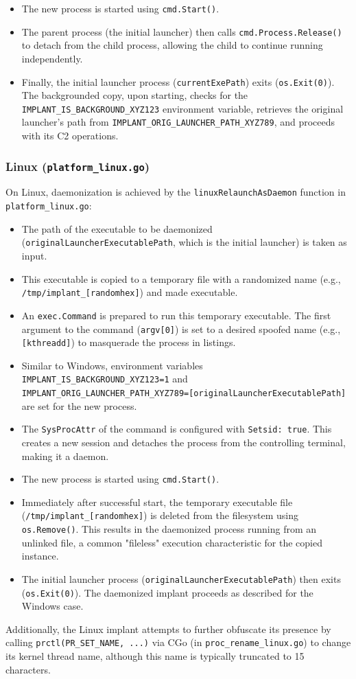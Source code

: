 \begin{itemize}
    \item The new process is started using \texttt{cmd.Start()}.
    \item The parent process (the initial launcher) then calls \texttt{cmd.Process.Release()} to detach from the child process, allowing the child to continue running independently.
    \item Finally, the initial launcher process (\texttt{currentExePath}) exits (\texttt{os.Exit(0)}). The backgrounded copy, upon starting, checks for the \texttt{IMPLANT\_IS\_BACKGROUND\_XYZ123} environment variable, retrieves the original launcher's path from \texttt{IMPLANT\_ORIG\_LAUNCHER\_PATH\_XYZ789}, and proceeds with its C2 operations.
\end{itemize}

\subsubsection{Linux (\texttt{platform\_linux.go})}
On Linux, daemonization is achieved by the \texttt{linuxRelaunchAsDaemon} function in \texttt{platform\_linux.go}:
\begin{itemize}
    \item The path of the executable to be daemonized (\texttt{originalLauncherExecutablePath}, which is the initial launcher) is taken as input.
    \item This executable is copied to a temporary file with a randomized name (e.g., \texttt{/tmp/implant\_[randomhex]}) and made executable.
    \item An \texttt{exec.Command} is prepared to run this temporary executable. The first argument to the command (\texttt{argv[0]}) is set to a desired spoofed name (e.g., \texttt{[kthreadd]}) to masquerade the process in listings.
    \item Similar to Windows, environment variables \texttt{IMPLANT\_IS\_BACKGROUND\_XYZ123=1} and \texttt{IMPLANT\_ORIG\_LAUNCHER\_PATH\_XYZ789=[originalLauncherExecutablePath]} are set for the new process.
    \item The \texttt{SysProcAttr} of the command is configured with \texttt{Setsid: true}. This creates a new session and detaches the process from the controlling terminal, making it a daemon.
    \item The new process is started using \texttt{cmd.Start()}.
    \item Immediately after successful start, the temporary executable file (\texttt{/tmp/implant\_[randomhex]}) is deleted from the filesystem using \texttt{os.Remove()}. This results in the daemonized process running from an unlinked file, a common "fileless" execution characteristic for the copied instance.
    \item The initial launcher process (\texttt{originalLauncherExecutablePath}) then exits (\texttt{os.Exit(0)}). The daemonized implant proceeds as described for the Windows case.
\end{itemize}
Additionally, the Linux implant attempts to further obfuscate its presence by calling \texttt{prctl(PR\_SET\_NAME, ...)} via CGo (in \texttt{proc\_rename\_linux.go}) to change its kernel thread name, although this name is typically truncated to 15 characters.


